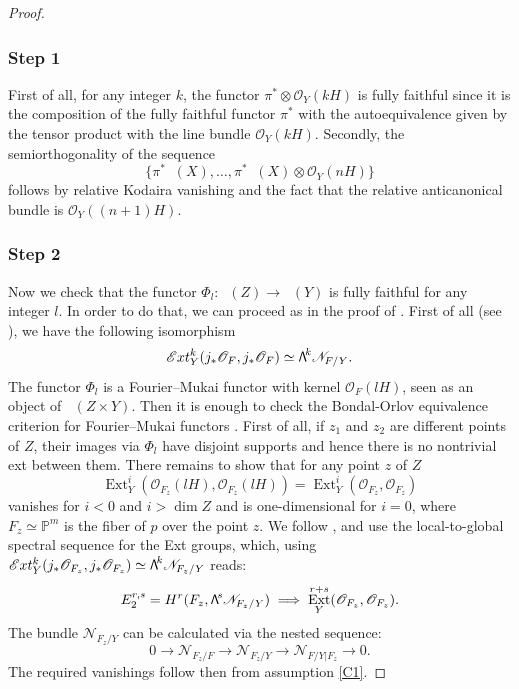 \documentclass[11pt]{article}
\newcommand{\skpt}{\smallskip}
\newcommand\bw[1]{{\hbox{\large$\mathsf{\Lambda}$}^{\!#1}}}
\let\mathcal\mathscr
\theoremstyle{plain}
\theoremstyle{definition}
\newcommand{\cat}[1]{\mathsf{#1}}
\DeclareMathOperator{\Db}{{\cat{D}^{\mathrm{b}}}}
\DeclareMathOperator{\Ext}{Ext}
\newcommand{\PP}{\mathbb{P}}
\newcommand{\sheaf}[1]{\mathcal{#1}}
\newcommand{\kn}{\sheaf{N}}
\newcommand{\ko}{\sheaf{O}}\let\OO\ko\let\cO\ko
\begin{document}
\skpt
\begin{proof}\vspace*{-8pt}
\subsubsection*{Step 1}
First of all, for any integer $k$, the functor $\pi^* \otimes \ko_Y(kH)$ is fully faithful since it
is the composition of the fully faithful functor $\pi^*$ with the autoequivalence given by the tensor
product with the line bundle $\ko_Y(kH)$. Secondly, the semiorthogonality of the
sequence
\[
\{ \pi^*\Db(X),\ldots,\pi^*\Db(X)\otimes \ko_Y(nH) \}
\]
follows by
relative Kodaira vanishing and the fact that the relative anticanonical bundle is $\ko_Y((n+1)H)$.

\subsubsection*{Step 2}
Now we check that the functor $\Phi_l : \Db(Z) \to \Db(Y)$ is fully faithful for any
integer $l$.
In order to do that, we can proceed as in the proof of \cite[Prop.\,11.16]{Huybook}.
First of all (see \cite[Prop.\,11.8]{Huybook}), we have the following isomorphism
\[
{\mathcal{E}}xt_Y^k (j_*\ko_F,j_*\ko_F) \simeq \bw{k} \kn_{F/Y}.
\]
The functor $\Phi_l$ is a Fourier--Mukai functor with kernel $\ko_F(lH)$, seen as an object of
$\Db(Z \times Y)$. Then it is enough to check the Bondal-Orlov equivalence criterion for Fourier--Mukai
functors \cite{bondal-orlov-archive}. First of all, if $z_1$ and $z_2$ are different points of $Z$,
their images via $\Phi_l$ have disjoint supports and hence there is no nontrivial ext between them.
There remains to show that for any
point $z$ of $Z$
\[
\Ext^i_Y(\ko_{F_z}(lH),\ko_{F_z}(lH)) = \Ext^i_Y(\ko_{F_z},\ko_{F_z})
\]
vanishes for $i<0$ and $i>\dim Z$ and is one-dimensional for $i=0$, where $F_z \simeq \PP^m$
is the fiber of $p$ over the point $z$. We follow \cite[Prop.\,11.16]{Huybook}, and use the local-to-global
spectral sequence for the Ext groups, which, using
${\mathcal{E}}xt_Y^k (j_*\ko_{F_z},j_*\ko_{F_z}) \simeq \bw{k} \kn_{F_z/Y}$ reads:\vspace*{-3pt}
\[
E^{r,s}_2=H^r(F_z,\bw{s} \kn_{F_z/Y}) \implies \Ext_Y^{r+s}(\ko_{F_z},\ko_{F_z}).
\]
The bundle $\kn_{F_z/Y}$ can be calculated via the nested sequence:\vspace*{-3pt}
\[
0 \to \kn_{F_z/F} \to \kn_{F_z/Y} \to \kn_{F/Y \vert F_z} \to 0.
\]
The required vanishings follow then from assumption \eqref{C1}.


\end{proof}
\end{document}
